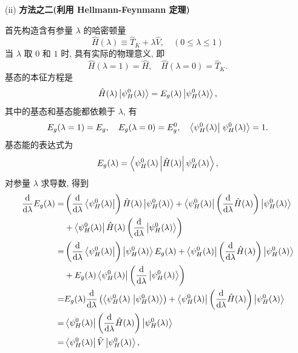 (ii) \textbf{方法之二(利用 Hellmann-Feynmann 定理)}

首先构造含有参量 $\lambda$ 的哈密顿量
\begin{equation}
    \hat{H}(\lambda)\equiv \hat{T}_K+\lambda\hat{V},\quad (0\le \lambda\le 1)
\end{equation}
当 $\lambda$ 取 $0$ 和 $1$ 时, 具有实际的物理意义, 即
\begin{equation}
    \hat{H}(\lambda=1)=\hat{H},\quad \hat{H}(\lambda=0)=\hat{T}_K.
\end{equation}
基态的本征方程是
\begin{equation}
    \hat{H}(\lambda)\left|\psi_H^0(\lambda)\right\rangle=E_g(\lambda)\left| \psi_H^0(\lambda) \right\rangle,
\end{equation}
其中的基态和基态能都依赖于 $\lambda$, 有
\begin{equation}
    E_g(\lambda=1)=E_g,\quad E_g(\lambda=0)=E_g^0,\quad \left\langle\psi_H^0(\lambda)\right|\left.\psi_H^0(\lambda)\right\rangle=1.
\end{equation}
基态能的表达式为
\begin{equation}
    E_g(\lambda)=\left\langle\psi_H^0(\lambda)\left|\hat{H}(\lambda)\right|\psi_H^0(\lambda)\right\rangle,
\end{equation}
对参量 $\lambda$ 求导数, 得到
 \begin{align}
        \frac{\mathrm{d}}{\mathrm{d}\lambda}E_g(\lambda)=&\left( \frac{\mathrm{d}}{\mathrm{d} \lambda}\left\langle\psi_H^0(\lambda)\right| \right)\hat{H}(\lambda)\left|\psi_H^0(\lambda)\right\rangle+\left\langle\psi_H^0(\lambda)\right| \left(\frac{\mathrm{d}}{\mathrm{d} \lambda}\hat{H}(\lambda) \right) \left|\psi_H^0(\lambda)\right\rangle\nonumber\\
        &+\left\langle\psi_H^0(\lambda)\right|\hat{H}(\lambda)\left(\frac{\mathrm{d}}{\mathrm{d} \lambda}\left|\psi_H^0(\lambda)\right\rangle\right)\nonumber\\
        =&\left(\frac{\mathrm{d}}{\mathrm{d} \lambda}\left\langle\psi_H^0(\lambda)\right|\right) \left|\psi_H^0(\lambda)\right\rangle E_g(\lambda)+\left\langle\psi_H^0(\lambda)\right|\left( \frac{\mathrm{d}}{\mathrm{d}\lambda}\hat{H}(\lambda) \right)\left|\psi_H^0(\lambda)\right\rangle\nonumber\\
        &+E_g(\lambda)\left\langle\psi_H^0(\lambda)\right|\left( \frac{\mathrm{d}}{\mathrm{d} \lambda}\left|\psi_H^0(\lambda)\right\rangle \right)\nonumber\\
        =&E_g(\lambda)\frac{\mathrm{d}}{\mathrm{d}\lambda}\left(\left\langle\psi_H^0(\lambda)\right.\left|\psi_H^0(\lambda)\right\rangle\right)+\left\langle\psi_H^0(\lambda)\right|\left(\frac{\mathrm{d}}{\mathrm{d} \lambda}\hat{H}(\lambda)\right)\left|\psi_H^0(\lambda)\right\rangle\nonumber\\
        =&\left\langle\psi_H^0(\lambda)\right|\left( \frac{\mathrm{d}}{\mathrm{d}\lambda}\hat{H}(\lambda) \right)\left|\psi_H^0(\lambda)\right\rangle\nonumber\\
        =&\left\langle\psi_H^0(\lambda)\right|\hat{V}\left|\psi_H^0(\lambda)\right\rangle,
    \end{align}
